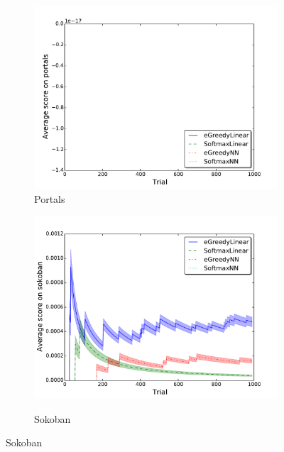 \documentclass[conference]{IEEEtran}
\begin{document}
\begin{figure}[!t]
	\begin{center}

\begin{subfigure} {\lefig\textwidth}
	\includegraphics[width = \textwidth]{img/portals_scores}
  \caption{Portals}
\end{subfigure}\begin{subfigure} {\lefig\textwidth}
	\includegraphics[width = \textwidth]{img/sokoban_scores}\\
  \caption{Sokoban}
\end{subfigure}


\end{center}
\end{figure}
\end{document}
